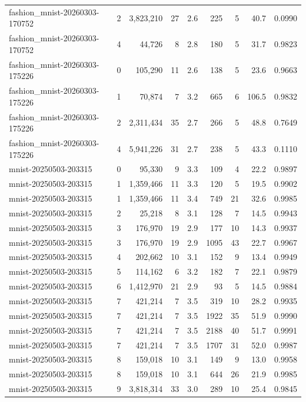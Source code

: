 \begin{tabular}{llrrrrrrr}
fashion_mnist-20260303-170752 & 2 & 3,823,210 & 27 & 2.6 & 225 & 5 & 40.7 & 0.0990 \\
fashion_mnist-20260303-170752 & 4 & 44,726 & 8 & 2.8 & 180 & 5 & 31.7 & 0.9823 \\
fashion_mnist-20260303-175226 & 0 & 105,290 & 11 & 2.6 & 138 & 5 & 23.6 & 0.9663 \\
fashion_mnist-20260303-175226 & 1 & 70,874 & 7 & 3.2 & 665 & 6 & 106.5 & 0.9832 \\
fashion_mnist-20260303-175226 & 2 & 2,311,434 & 35 & 2.7 & 266 & 5 & 48.8 & 0.7649 \\
fashion_mnist-20260303-175226 & 4 & 5,941,226 & 31 & 2.7 & 238 & 5 & 43.3 & 0.1110 \\
mnist-20250503-203315 & 0 & 95,330 & 9 & 3.3 & 109 & 4 & 22.2 & 0.9897 \\
mnist-20250503-203315 & 1 & 1,359,466 & 11 & 3.3 & 120 & 5 & 19.5 & 0.9902 \\
mnist-20250503-203315 & 1 & 1,359,466 & 11 & 3.4 & 749 & 21 & 32.6 & 0.9985 \\
mnist-20250503-203315 & 2 & 25,218 & 8 & 3.1 & 128 & 7 & 14.5 & 0.9943 \\
mnist-20250503-203315 & 3 & 176,970 & 19 & 2.9 & 177 & 10 & 14.3 & 0.9937 \\
mnist-20250503-203315 & 3 & 176,970 & 19 & 2.9 & 1095 & 43 & 22.7 & 0.9967 \\
mnist-20250503-203315 & 4 & 202,662 & 10 & 3.1 & 152 & 9 & 13.4 & 0.9949 \\
mnist-20250503-203315 & 5 & 114,162 & 6 & 3.2 & 182 & 7 & 22.1 & 0.9879 \\
mnist-20250503-203315 & 6 & 1,412,970 & 21 & 2.9 & 93 & 5 & 14.5 & 0.9884 \\
mnist-20250503-203315 & 7 & 421,214 & 7 & 3.5 & 319 & 10 & 28.2 & 0.9935 \\
mnist-20250503-203315 & 7 & 421,214 & 7 & 3.5 & 1922 & 35 & 51.9 & 0.9990 \\
mnist-20250503-203315 & 7 & 421,214 & 7 & 3.5 & 2188 & 40 & 51.7 & 0.9991 \\
mnist-20250503-203315 & 7 & 421,214 & 7 & 3.5 & 1707 & 31 & 52.0 & 0.9987 \\
mnist-20250503-203315 & 8 & 159,018 & 10 & 3.1 & 149 & 9 & 13.0 & 0.9958 \\
mnist-20250503-203315 & 8 & 159,018 & 10 & 3.1 & 644 & 26 & 21.9 & 0.9985 \\
mnist-20250503-203315 & 9 & 3,818,314 & 33 & 3.0 & 289 & 10 & 25.4 & 0.9845 \\

\end{tabular}
